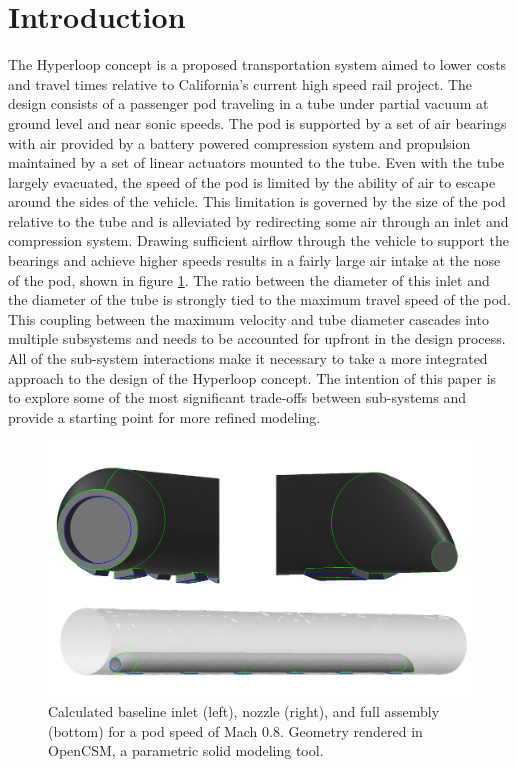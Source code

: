 \documentclass[heading.tex]{subfiles}
\begin{document}
\section{Introduction}

The Hyperloop concept is a proposed transportation system aimed to lower costs and travel times relative to California's current high speed
 rail project. \cite{Musk} The design consists of a passenger pod traveling in a tube under partial vacuum at ground level and near sonic
speeds. The pod is supported by a set of air bearings with air provided by a battery powered compression system and propulsion maintained
by a set of linear actuators mounted to the tube. Even with the tube largely evacuated, the speed of the pod is limited by the ability of air to
escape around the sides of the vehicle. This limitation is governed by the size of the pod relative to the tube and is alleviated by redirecting some air
through an inlet and compression system. Drawing sufficient airflow through the vehicle to support the bearings and achieve higher speeds results
in a fairly large air intake at the nose of the pod, shown in figure \ref{f:hyperloopCAD}. The ratio between the diameter of this inlet and the diameter of the
tube is strongly tied to the maximum travel speed of the pod. This coupling between the maximum velocity and
tube diameter cascades into multiple subsystems and needs to be accounted for upfront in the design process. 
All of the sub-system interactions make it necessary to take a more integrated approach to the design of the Hyperloop concept. The intention of
this paper is to explore some of the most significant trade-offs between sub-systems and provide a starting point for more refined modeling.

\begin{figure}[hbtp]
\centering
\includegraphics[width=\textwidth]{images/hyperloop_cad.png}
 \caption[Hyperloop geometry assembled in OpenCSM]{Calculated baseline inlet (left), nozzle (right), and full assembly (bottom) for a pod speed of Mach 0.8. Geometry rendered in OpenCSM, a parametric solid modeling tool.}
\label{f:hyperloopCAD}
\end{figure}
\end{document}
